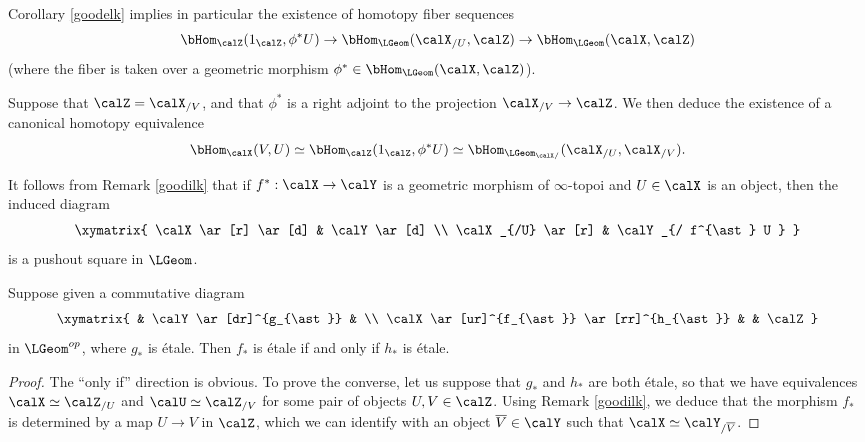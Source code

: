 \begin{remark}\label{goodilk}
Corollary \ref{goodelk} implies in particular the existence of homotopy fiber sequences
$$ \bHom_{\calZ}( 1_{\calZ}, \phi^{\ast} U ) \rightarrow \bHom_{ \LGeom }( \calX_{/U}, \calZ)
\rightarrow \bHom_{\LGeom}(\calX, \calZ)$$
(where the fiber is taken over a geometric morphism $\phi^{\ast} \in \bHom_{\LGeom}(\calX, \calZ)$).

Suppose that $\calZ = \calX_{/V}$, and that $\phi^{\ast}$ is a right adjoint to the projection
$\calX_{/V} \rightarrow \calZ$. We then deduce the existence of a canonical homotopy equivalence
$$ \bHom_{\calX}(V,U) \simeq \bHom_{\calZ}( 1_{\calZ}, \phi^{\ast} U ) \simeq
\bHom_{ \LGeom_{\calX/}}( \calX_{/U}, \calX_{/V} ).$$
\end{remark}

\begin{remark}\label{pusha}
It follows from Remark \ref{goodilk} that if $f^{\ast}: \calX \rightarrow \calY$ is a geometric morphism
of $\infty$-topoi and $U \in \calX$ is an object, then the induced diagram
$$ \xymatrix{ \calX \ar[r] \ar[d] & \calY \ar[d] \\
\calX_{/U} \ar[r] & \calY_{/ f^{\ast} U } }$$
is a pushout square in $\LGeom$.
\end{remark}


\begin{corollary}\label{toadscan}
Suppose given a commutative diagram
$$ \xymatrix{ & \calY \ar[dr]^{g_{\ast}} & \\
\calX \ar[ur]^{f_{\ast}} \ar[rr]^{h_{\ast}} & & \calZ }$$
in $\LGeom^{op}$, where $g_{\ast}$ is \'{e}tale. Then $f_{\ast}$ is \'{e}tale if and only if $h_{\ast}$ is \'{e}tale.
\end{corollary}

\begin{proof}
The ``only if'' direction is obvious. To prove the converse, let us suppose
that $g_{\ast}$ and $h_{\ast}$ are both \'{e}tale, so that we have
equivalences $\calX \simeq \calZ_{/U}$ and $\calU \simeq \calZ_{/V}$ for some pair
of objects $U, V \in \calZ$. 
Using Remark \ref{goodilk}, we deduce that the morphism $f_{\ast}$ is determined by
a map $U \rightarrow V$ in $\calZ$, which we can identify with an object $\overline{V} \in \calY$
such that $\calX \simeq \calY_{/ \overline{V} }$. 
\end{proof}

